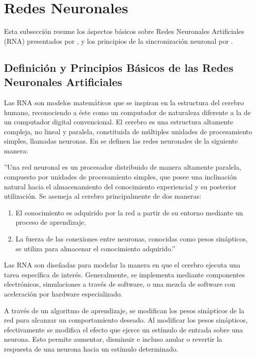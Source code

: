 \section{Redes Neuronales}
Esta subsección resume los áspectos básicos sobre Redes Neuronales Artificiales (RNA) presentados por \cite{haykin-2009}, y los principios de la sincronización neuronal por \cite{ruttor_neural_2006}. 
\subsection{Definición y Principios Básicos de las Redes Neuronales Artificiales} 
Las RNA son modelos matemáticos que se inspiran en la estructura del cerebro humano, reconociendo a éste como un computador de naturaleza diferente a la de un computador digital convencional. El cerebro es una estructura altamente compleja, no lineal y paralela, constituida de múltiples unidades de procesamiento simples, llamadas neuronas. En \cite{haykin-2009} se definen las redes neuronales de la siguiente manera: 

''Una red neuronal es un procesador distribuido de manera altamente paralela, compuesto por unidades de procesamiento simples, que posee una inclinación natural hacia el almacenamiento del conocimiento experiencial y su posterior utilización. Se asemeja al cerebro principalmente de dos maneras:
    \begin{enumerate}
        \item El conocimiento es adquirido por la red a partir de su entorno mediante un proceso de aprendizaje.
        \item La fuerza de las conexiones entre neuronas, conocidas como pesos sinápticos, se utiliza para almacenar el conocimiento adquirido.''
    \end{enumerate}

Las RNA son diseñadas para modelar la manera en que el cerebro ejecuta una tarea específica de interés. Generalmente, se implementa mediante componentes electrónicos, simulaciones a través de software, o una mezcla de software con aceleración por hardware especializado. 

A través de un algoritmo de aprendizaje, se modifican los pesos sinápticos de la red para alcanzar un comportamiento deseado. Al modificar los pesos sinápticos, efectivamente se modifica el efecto que ejerce un estímulo de entrada sobre una neurona. Esto permite aumentar, disminuir e incluso anular o revertir la respuesta de una neurona hacia un estímulo determinado. 

